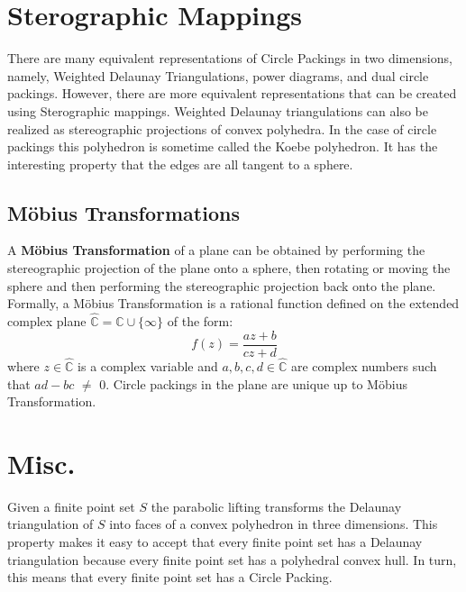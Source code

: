 \documentclass[11pt]{article}
\newcommand{\C}{\mathbb{C}}
\newcommand{\CP}{\hat{\mathbb{C}}}
\begin{document}
\section{Sterographic Mappings}
There are many equivalent representations of Circle Packings in two dimensions, namely, Weighted Delaunay Triangulations, power diagrams, and dual circle packings. However, there are more equivalent representations that can be created using Sterographic mappings. Weighted Delaunay triangulations can also be realized as stereographic projections of convex polyhedra. In the case of circle packings this polyhedron is sometime called the Koebe polyhedron. It has the interesting property that the edges are all tangent to a sphere.

\subsection{M\"{o}bius Transformations}
 A \textbf{M\"{o}bius Transformation} of a plane can be obtained by performing the stereographic projection of the plane onto a sphere, then rotating or moving the sphere and then performing the stereographic projection back onto the plane. 
  Formally, a M\"{o}bius Transformation is a rational function defined on the extended complex plane $\CP = \C\cup\{\infty\}$ of the form:
  \begin{equation} 
  	f(z) = \frac{az+b}{cz+d}
  \end{equation}
  where $z\in\CP$ is a complex variable and $a,b,c,d\in\CP$ are complex numbers such that $ad - bc$ $\neq$ $0$.
  Circle packings in the plane are unique up to M\"{o}bius Transformation.

\section{Misc.}
Given a finite point set $S$ the parabolic lifting transforms the Delaunay triangulation of $S$ into faces of a convex polyhedron in three dimensions. This property makes it easy to accept that every finite point set has a Delaunay triangulation because every finite point set has a polyhedral convex hull. In turn, this means that every finite point set has a Circle Packing.



\end{document}
